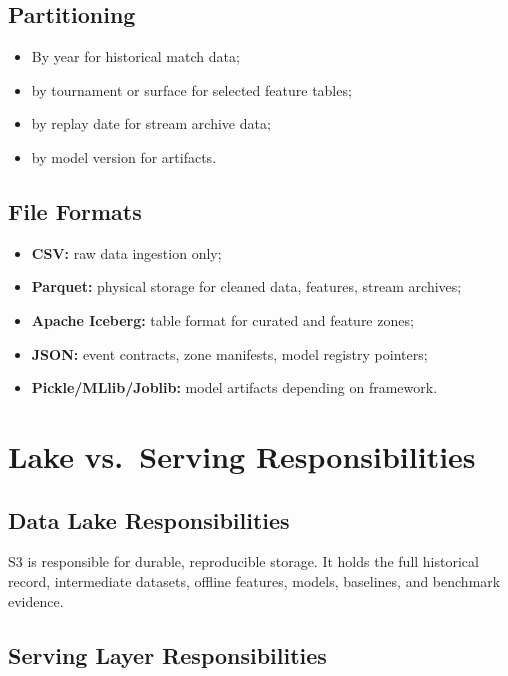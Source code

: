 \documentclass[11pt,a4paper]{article}
\begin{document}
\subsection{Partitioning}

\begin{itemize}[nosep]
  \item By year for historical match data;
  \item by tournament or surface for selected feature tables;
  \item by replay date for stream archive data;
  \item by model version for artifacts.
\end{itemize}

\subsection{File Formats}

\begin{itemize}[nosep]
  \item \textbf{CSV:} raw data ingestion only;
  \item \textbf{Parquet:} physical storage for cleaned data, features, stream archives;
  \item \textbf{Apache Iceberg:} table format for curated and feature zones;
  \item \textbf{JSON:} event contracts, zone manifests, model registry pointers;
  \item \textbf{Pickle/MLlib/Joblib:} model artifacts depending on framework.
\end{itemize}

\section{Lake vs.\ Serving Responsibilities}

\subsection{Data Lake Responsibilities}

S3 is responsible for durable, reproducible storage. It holds the full historical record,
intermediate datasets, offline features, models, baselines, and benchmark evidence.

\subsection{Serving Layer Responsibilities}
\end{document}
